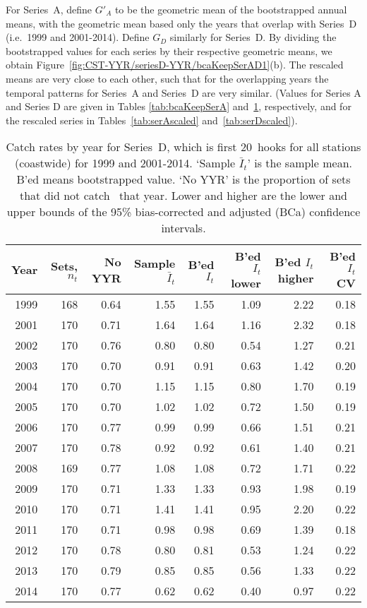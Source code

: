 For Series~A, define $G'_{A}$ to be the geometric mean of the bootstrapped
annual means, with the geometric mean based only the years that overlap with
Series~D (i.e.~1999 and 2001-2014). Define $G_D$ similarly for Series~D. By
dividing the bootstrapped values for each series by their respective geometric
means, we obtain Figure~\ref{fig:CST-YYR/seriesD-YYR/bcaKeepSerAD1}(b). The
rescaled means are very close to each other, such that for the overlapping years
the temporal patterns for Series~A and Series~D are very similar. (Values for
Series A and Series D are given in Tables \ref{tab:bcaKeepSerA}
and~\ref{tab:bcaKeepSerD}, respectively, and for the rescaled series in
Tables~\ref{tab:serAscaled} and~\ref{tab:serDscaled}).
\begin{table}[tp]
\centering
\caption{Catch rates by year for Series~D, which is first 20~hooks
      for all stations (coastwide) for 1999 and 2001-2014.
     `Sample $\bar{I}_t$' is the sample mean. B'ed means bootstrapped 
     value. `No YYR' is the proportion of sets that did not catch \spName~that
     year. Lower and higher are the 
     lower and upper bounds of the 95\% bias-corrected and adjusted (BCa)
     confidence intervals.} 
\label{tab:bcaKeepSerD}
\begin{tabular}{rrrrrrrr}
  \hline
Year & Sets, $n_t$ & No YYR & Sample $\bar{I}_t$ & B'ed $I_t$ & B'ed $I_t$ lower & B'ed $I_t$ higher & B'ed $I_t$ CV \\ 
  \hline
1999 & 168 & 0.64 & 1.55 & 1.55 & 1.09 & 2.22 & 0.18 \\ 
  2001 & 170 & 0.71 & 1.64 & 1.64 & 1.16 & 2.32 & 0.18 \\ 
  2002 & 170 & 0.76 & 0.80 & 0.80 & 0.54 & 1.27 & 0.21 \\ 
  2003 & 170 & 0.70 & 0.91 & 0.91 & 0.63 & 1.42 & 0.20 \\ 
  2004 & 170 & 0.70 & 1.15 & 1.15 & 0.80 & 1.70 & 0.19 \\ 
  2005 & 170 & 0.70 & 1.02 & 1.02 & 0.72 & 1.50 & 0.19 \\ 
  2006 & 170 & 0.77 & 0.99 & 0.99 & 0.66 & 1.51 & 0.21 \\ 
  2007 & 170 & 0.78 & 0.92 & 0.92 & 0.61 & 1.40 & 0.21 \\ 
  2008 & 169 & 0.77 & 1.08 & 1.08 & 0.72 & 1.71 & 0.22 \\ 
  2009 & 170 & 0.71 & 1.33 & 1.33 & 0.93 & 1.98 & 0.19 \\ 
  2010 & 170 & 0.71 & 1.41 & 1.41 & 0.95 & 2.20 & 0.22 \\ 
  2011 & 170 & 0.71 & 0.98 & 0.98 & 0.69 & 1.39 & 0.18 \\ 
  2012 & 170 & 0.78 & 0.80 & 0.81 & 0.53 & 1.24 & 0.22 \\ 
  2013 & 170 & 0.79 & 0.85 & 0.85 & 0.56 & 1.33 & 0.22 \\ 
  2014 & 170 & 0.77 & 0.62 & 0.62 & 0.40 & 0.97 & 0.22 \\ 
   \hline
\end{tabular}
\end{table}%

